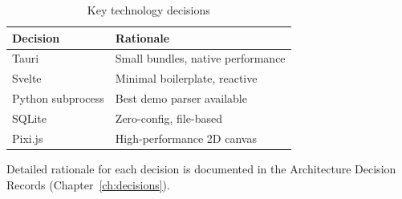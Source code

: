 \begin{table}[h]
    \centering
    \begin{tabular}{@{}ll@{}}
        \toprule
        \textbf{Decision} & \textbf{Rationale} \\
        \midrule
        Tauri & Small bundles, native performance \\
        Svelte & Minimal boilerplate, reactive \\
        Python subprocess & Best demo parser available \\
        SQLite & Zero-config, file-based \\
        Pixi.js & High-performance 2D canvas \\
        \bottomrule
    \end{tabular}
    \caption{Key technology decisions}
\end{table}

Detailed rationale for each decision is documented in the Architecture Decision Records (Chapter~\ref{ch:decisions}).
